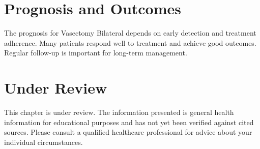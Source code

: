\section*{Prognosis and Outcomes}
The prognosis for Vasectomy Bilateral depends on early detection and treatment adherence. Many patients respond well to treatment and achieve good outcomes. Regular follow-up is important for long-term management.
\section*{Under Review}
This chapter is under review. The information presented is general health information for educational purposes and has not yet been verified against cited sources. Please consult a qualified healthcare professional for advice about your individual circumstances.


\clearpage
